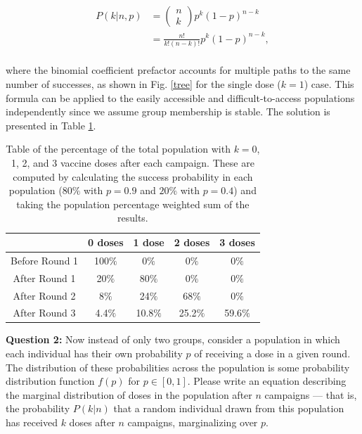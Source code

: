 \documentclass[prl,onecolumn,amsmath,amssymb,superscriptaddress,notitlepage]{revtex4-1}
\begin{document}
\begin{equation}
\begin{split}
P(k|n,p) &= \begin{pmatrix} n \\ k \end{pmatrix}p^k(1-p)^{n-k} \\
&= \frac{n!}{k!(n-k)!}p^k(1-p)^{n-k}, \label{fixed_p}
\end{split}
\end{equation}
\\
where the binomial coefficient prefactor accounts for multiple paths to the same number of successes, as shown in Fig. \ref{tree} for the single dose ($k=1$) case. This formula can be applied to the easily accessible and difficult-to-access populations independently since we assume group membership is stable. The solution is presented in Table \ref{table}.
\begin{center}
\begin{table}[h!]
\def\arraystretch{1.5}
\setlength\tabcolsep{0.25in}
\begin{tabular}{| c | c | c | c | c |}
\hline
 & 0 doses & 1 dose & 2 doses & 3 doses \\
\hline
Before Round 1 & 100$\%$ & 0$\%$ & 0$\%$ & 0$\%$ \\
\hline
After Round 1 & 20$\%$ & 80$\%$ & 0$\%$ & 0$\%$ \\
\hline
After Round 2 & 8$\%$ & 24$\%$ & 68$\%$ & 0$\%$ \\
\hline
After Round 3 & 4.4$\%$ & 10.8$\%$ & 25.2$\%$ & 59.6$\%$ \\
\hline
\end{tabular}
\caption{Table of the percentage of the total population with $k=0$, 1, 2, and 3 vaccine doses after each campaign. These are computed by calculating the success probability in each population ($80\%$ with $p=0.9$ and $20\%$ with $p=0.4$) and taking the population percentage weighted sum of the results.}\label{table}
\end{table}
\end{center}

{\color{myred}\textbf{Question 2:} Now instead of only two groups, consider a population in which each individual has their own probability $p$ of receiving a dose in a given round.  The distribution of these probabilities across the population is some probability distribution function $f(p)$ for  $p\in[0, 1]$. Please write an equation describing the marginal distribution of doses in the population after $n$ campaigns --- that is, the probability $P(k| n)$ that a random individual drawn from this population has received $k$ doses after $n$ campaigns, marginalizing over $p$.}
\\
\end{document}
